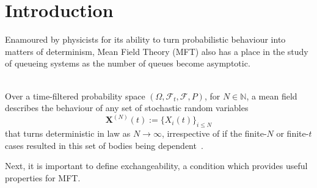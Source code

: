 

\chapter{Introduction}\label{ch:introduction2}\label{ch:introduction}
Enamoured by physicists for its ability to turn probabilistic behaviour into matters of determinism, Mean Field Theory (MFT) also has a place in the study of queueing systems as the number of queues become asymptotic.
\begin{definition}
    \hfill \\
    Over a time-filtered probability space $(\Omega, \mathcal{F}_{t},\mathcal{F},P)$, for $N \in \mathbb{N}$, a mean field describes the behaviour of any set of stochastic random variables
    \[
        \mathbf{X}^{(N)}(t) := \{X_{i}(t)\}_{i \leq N}
    \]
    that turns deterministic in law as $N \rightarrow \infty$, irrespective of if the finite-$N$ or finite-$t$ cases resulted in this set of bodies being dependent~\cite{mukhopadhyay_analysis_nodate}.
\end{definition}

Next, it is important to define exchangeability, a condition which provides useful properties for MFT.

